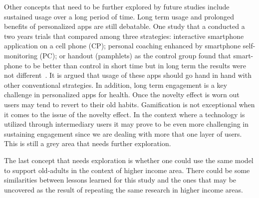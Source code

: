 Other concepts that need to be further explored by future studies include sustained usage over a long period of time. Long term usage and prolonged benefits of personalized apps are still debatable. One study that a conducted a two years trials that compared among three strategies: interactive smartphone application on a cell phone (CP); personal coaching enhanced by smartphone self-monitoring (PC); or handout (pamphlets) as the control group found that smart-phone to be better than control in short time but in long term the results were not different~\citep{svetkey2015cell}. It is argued that usage of these apps should go hand in hand with other conventional strategies. In addition,  long  term engagement is a key challenge in personalized apps for health. Once the novelty effect is worn out users may tend to revert to their old habits. Gamification is not exceptional when it comes to the issue of the novelty effect. In the context where a technology is utilized through intermediary users it may prove to be even more challenging in sustaining engagement since we are dealing with more that one layer of users. This is still a grey area that needs further exploration.

The last concept that needs exploration is whether one could use the same model to support old-adults in the context of higher income area. There could be some similarities between lessons learned for this study and the ones that may be uncovered as the result of repeating the same research  in higher income areas.
\begin{flushright}
\end{flushright}
